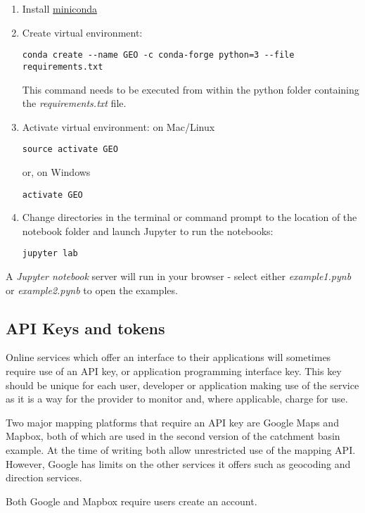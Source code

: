 \documentclass[utf8]{frontiers_suppmat} %
\begin{document}
\begin{enumerate}
\item  Install \href{https://docs.conda.io/en/latest/miniconda.html}{miniconda}
\item  Create virtual environment: 
\begin{verbatim}
conda create --name GEO -c conda-forge python=3 --file requirements.txt
\end{verbatim}

This command needs to be executed from within the python folder containing the {\em requirements.txt} file.

\item Activate virtual environment: 
on Mac/Linux
\begin{verbatim}
source activate GEO  
\end{verbatim}
or, on Windows
\begin{verbatim}
activate GEO 
\end{verbatim}
\item Change directories in the terminal or command prompt to the location of the
notebook folder and launch Jupyter to run the notebooks:
\begin{verbatim}
jupyter lab
\end{verbatim}
\end{enumerate}

A {\em Jupyter notebook} server will run in your browser - select
either {\em example1.pynb} or {\em example2.pynb}
to open the examples.


\subsection{API Keys and tokens}\label{api-keys}

Online services which offer an interface to their applications will
sometimes require use of an API key, or application programming
interface key. This key should be unique for each user, developer or
application making use of the service as it is a way for the provider to
monitor and, where applicable, charge for use.

Two major mapping platforms that require an API key are Google Maps
and Mapbox, both of which are used in the second version of the
catchment basin example. At the time of writing both allow
unrestricted use of the mapping API. However, Google has limits on the
other services it offers such as geocoding and direction services.

Both Google and Mapbox require users create an account.
\end{document}
